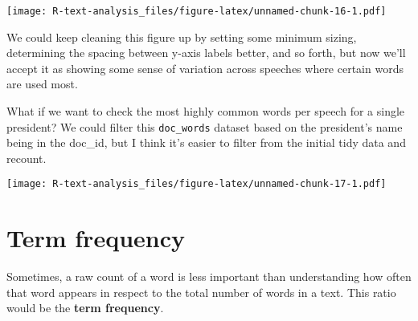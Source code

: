 \documentclass[]{book}
\newenvironment{Shaded}{\begin{snugshade}}{\end{snugshade}}
\newcommand{\DataTypeTok}[1]{\textcolor[rgb]{0.13,0.29,0.53}{#1}}
\newcommand{\DecValTok}[1]{\textcolor[rgb]{0.00,0.00,0.81}{#1}}
\newcommand{\KeywordTok}[1]{\textcolor[rgb]{0.13,0.29,0.53}{\textbf{#1}}}
\newcommand{\NormalTok}[1]{#1}
\newcommand{\OperatorTok}[1]{\textcolor[rgb]{0.81,0.36,0.00}{\textbf{#1}}}
\newcommand{\OtherTok}[1]{\textcolor[rgb]{0.56,0.35,0.01}{#1}}
\newcommand{\StringTok}[1]{\textcolor[rgb]{0.31,0.60,0.02}{#1}}
\begin{document}
\texttt{[image: R-text-analysis\_files/figure-latex/unnamed-chunk-16-1.pdf]}

We could keep cleaning this figure up by setting some minimum sizing, determining the spacing between y-axis labels better, and so forth, but now we'll accept it as showing some sense of variation across speeches where certain words are used most.

What if we want to check the most highly common words per speech for a single president? We could filter this \texttt{doc\_words} dataset based on the president's name being in the doc\_id, but I think it's easier to filter from the initial tidy data and recount.

\begin{Shaded}
\end{Shaded}

\texttt{[image: R-text-analysis\_files/figure-latex/unnamed-chunk-17-1.pdf]}

\hypertarget{term-frequency}{%
\section{Term frequency}\label{term-frequency}}

Sometimes, a raw count of a word is less important than understanding how often that word appears in respect to the total number of words in a text. This ratio would be the \textbf{term frequency}.
\end{document}
